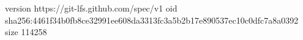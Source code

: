 version https://git-lfs.github.com/spec/v1
oid sha256:4461f34b0fb8ce32991ee608da3313fc3a5b2b17e890537ec10c0dfc7a8a0392
size 114258
